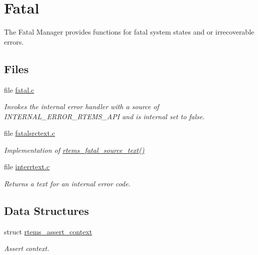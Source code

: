 \hypertarget{group__ClassicFatal}{}\section{Fatal}
\label{group__ClassicFatal}


The Fatal Manager provides functions for fatal system states and or irrecoverable errors.  


\subsection*{Files}
\begin{DoxyCompactItemize}
\item 
file \mbox{\hyperlink{fatal_8c}{fatal.\+c}}
\begin{DoxyCompactList}\small\item\em Invokes the internal error handler with a source of I\+N\+T\+E\+R\+N\+A\+L\+\_\+\+E\+R\+R\+O\+R\+\_\+\+R\+T\+E\+M\+S\+\_\+\+A\+PI and is internal set to false. \end{DoxyCompactList}\item 
file \mbox{\hyperlink{fatalsrctext_8c}{fatalsrctext.\+c}}
\begin{DoxyCompactList}\small\item\em Implementation of \mbox{\hyperlink{group__ClassicFatal_ga64fab8597e14215a31fa5ff98d3c1897}{rtems\+\_\+fatal\+\_\+source\+\_\+text()}} \end{DoxyCompactList}\item 
file \mbox{\hyperlink{interrtext_8c}{interrtext.\+c}}
\begin{DoxyCompactList}\small\item\em Returns a text for an internal error code. \end{DoxyCompactList}\end{DoxyCompactItemize}
\subsection*{Data Structures}
\begin{DoxyCompactItemize}
\item 
struct \mbox{\hyperlink{structrtems__assert__context}{rtems\+\_\+assert\+\_\+context}}
\begin{DoxyCompactList}\small\item\em Assert context. \end{DoxyCompactList}\end{DoxyCompactItemize}
